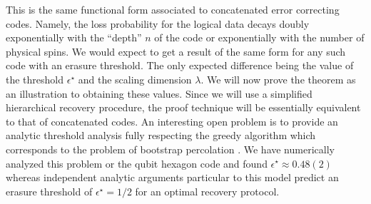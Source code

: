 \documentclass[12pt]{article}
\theoremstyle{plain}
\theoremstyle{plain}
\theoremstyle{plain}
\theoremstyle{plain}
\theoremstyle{result}
\theoremstyle{remark}
\theoremstyle{conjecture}
\theoremstyle{observation}
\theoremstyle{definition}
\theoremstyle{corollary}
\theoremstyle{definition}
\theoremstyle{definition}
\theoremstyle{assumption}
\theoremstyle{definition}
\theoremstyle{problem}
\theoremstyle{fact}
\begin{document}
This is the same functional form associated to concatenated error correcting codes.
Namely, the loss probability for the logical data decays doubly exponentially with the ``depth'' $n$ of the code or exponentially with the number of physical spins.
We would expect to get a result of the same form for any such code with an erasure threshold.
The only expected difference being the value of the threshold $\epsilon^\star$ and the scaling dimension $\lambda$.
We will now prove the theorem as an illustration to obtaining these values.
Since we will use a simplified hierarchical recovery procedure, the proof technique will be essentially equivalent to that of concatenated codes.
An interesting open problem is to provide an analytic threshold analysis fully respecting the greedy algorithm which corresponds to the problem of bootstrap percolation \cite{Adler1991}.
We have numerically analyzed this problem or the qubit hexagon code and found $\epsilon^\star \approx 0.48(2)$ whereas independent analytic arguments particular to this model predict an erasure threshold of $\epsilon^\star =1/2$ for an optimal recovery protocol.
\end{document}
